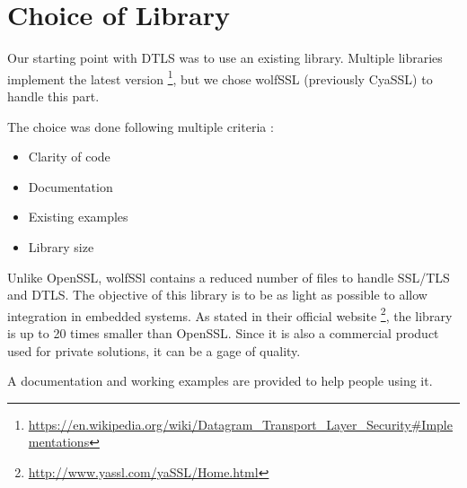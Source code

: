 \section{Choice of Library}

Our starting point with DTLS was to use an existing library. Multiple libraries implement the latest version \footnote{\url{https://en.wikipedia.org/wiki/Datagram_Transport_Layer_Security\#Implementations}}, but we chose wolfSSL (previously CyaSSL) to handle this part.

The choice was done following multiple criteria :

\begin{itemize}
\item Clarity of code
\item Documentation
\item Existing examples
\item Library size
\end{itemize}

Unlike OpenSSL, wolfSSl contains a reduced number of files to handle SSL/TLS and DTLS. The objective of this library is to be as light as possible to allow integration in embedded systems. As stated in their official website \footnote{\url{http://www.yassl.com/yaSSL/Home.html}}, the library is up to 20 times smaller than OpenSSL. Since it is also a commercial product used for private solutions, it can be a gage of quality. 

A documentation and working examples are provided to help people using it.
